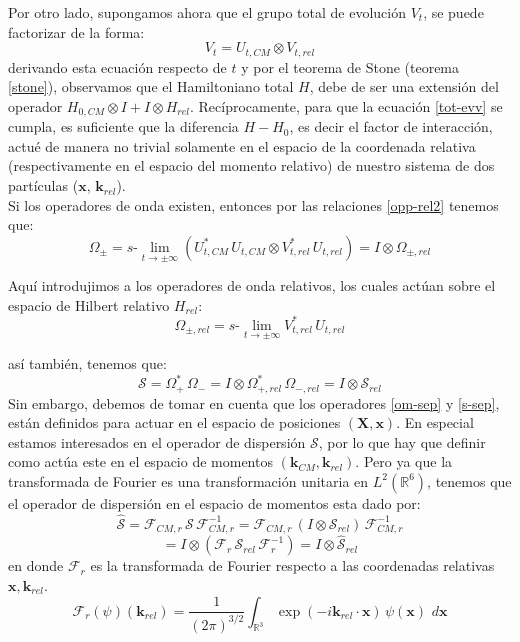 \documentclass[12pt]{book}
\numberwithin{equation}{chapter}
\def\R{\mathbb{R}}
\def\S{\mathcal{S}}
\def\rar{\rightarrow}
\def\F{\mathcal{F}}
\def\pr{\otimes}
\def\x{\mathbf{x}}
\def\xx{\mathbf{X}}
\def\k{\mathbf{k}}
\def\O{\Omega}
\def\slim{s\mbox{-}\lim}
\begin{document}
Por otro lado, supongamos ahora que el grupo total de evoluci\'on $V_{t}$, se puede factorizar de la forma:
\begin{equation}\label{tot-evv}
V_{t}= U_{t,CM} \pr V_{t,rel}
\end{equation}
derivando esta ecuaci\'on respecto de $t$ y por el teorema de Stone (teorema \ref{stone}), observamos que el Hamiltoniano total $H$, debe de ser una extensi\'on del operador $ H_{0,CM} \pr I + I \pr H_{rel} $. Rec\'iprocamente, para que la ecuaci\'on \eqref{tot-evv} se cumpla, es suficiente que la diferencia $H-H_{0}$, es decir el factor de interacci\'on, actu\'e de manera no trivial solamente en el espacio de la coordenada relativa (respectivamente en el espacio del momento relativo) de nuestro sistema de dos part\'iculas ($\x$, $\k_{rel}$).\\ 

Si los operadores de onda existen, entonces por las relaciones \eqref{opp-rel2} tenemos que:
\begin{equation}\label{om-sep}
\O_{\pm} = \slim_{t \rar \pm \infty} ( U_{t,CM}^{*} \, U_{t,CM} \pr V_{t,rel}^{*}\, U_{t,rel} )= I \pr \O_{\pm,rel}
\end{equation}

Aqu\'i introdujimos a los operadores de onda relativos, los cuales act\'uan sobre el espacio de Hilbert relativo $H_{rel}$:
\begin{equation}\label{wav-rel}
\O_{\pm,rel}= \slim_{t \rar \pm \infty} V_{t,rel}^{*} \, U_{t,rel}
\end{equation}

as\'i tambi\'en, tenemos que:
\begin{equation}\label{s-sep}
\S= \O_{+}^{*}\, \O_{-} = I \pr \O_{+,rel}^{*}\, \O_{-,rel} = I \pr \S_{rel}
\end{equation}
Sin embargo, debemos de tomar en cuenta que los operadores \eqref{om-sep} y \eqref{s-sep}, est\'an definidos para actuar en el espacio de posiciones $(\xx , \x)$. En especial estamos interesados en el operador de dispersi\'on $\S$, por lo que hay que definir como act\'ua este en el espacio de momentos $(\k_{CM} , \k_{rel})$. Pero ya que la transformada de Fourier es una transformaci\'on unitaria en $L^{2}(\R^{6})$, tenemos que el operador de dispersi\'on en el espacio de momentos esta dado por:
$$ \hat{\S}= \F_{CM,r} \, \S \, \F_{CM,r}^{-1} = \F_{CM,r} \, (I \pr \S_{rel}) \, \F_{CM,r}^{-1} $$
\begin{equation}\label{sp-rell}
= I \pr ( \F_{r} \, \S_{rel} \, \F_{r}^{-1} ) = I \pr \hat{\S}_{rel}
\end{equation}
en donde $\F_{r}$ es la transformada de Fourier respecto a las coordenadas relativas $\x , \k_{rel}$.
\begin{equation}
\F_{r}(\psi)(\k_{rel}) =\frac{1}{(2 \pi)^{3/2}} \int_{\R^{3}} \exp( -i\k_{rel} \cdot \x )\, \psi (\x) \, \, d\x
\end{equation}
\end{document}
